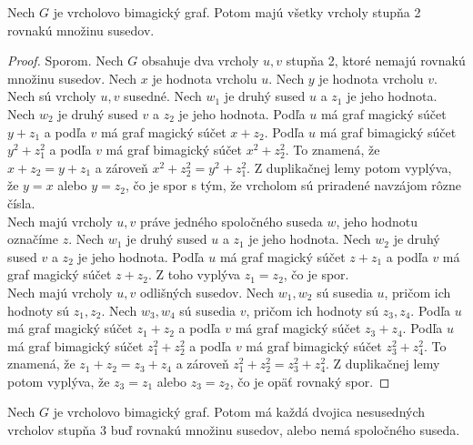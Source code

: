 \begin{subtheorem}
\label{vbgdegree2}
Nech $G$ je vrcholovo bimagický graf. Potom majú všetky vrcholy stupňa 2 rovnakú množinu susedov.
\end{subtheorem}

\begin{proof} Sporom. Nech $G$ obsahuje dva vrcholy $u,v$ stupňa 2, ktoré nemajú rovnakú množinu susedov. Nech $x$ je hodnota vrcholu $u$. Nech $y$ je hodnota vrcholu $v$. \\

Nech sú vrcholy $u,v$ susedné. Nech $w_1$ je druhý sused $u$ a $z_1$ je jeho hodnota. Nech $w_2$ je druhý sused $v$ a $z_2$ je jeho hodnota. Podľa $u$ má graf magický súčet $y + z_1$ a podľa $v$ má graf magický súčet $x + z_2$. Podľa $u$ má graf bimagický súčet $y^2 + z^2_1$ a podľa $v$ má graf bimagický súčet $x^2 + z^2_2$.  To znamená, že $x + z_2 = y + z_1$ a zároveň $x^2 + z^2_2 = y^2 + z^2_1$. Z duplikačnej lemy potom vyplýva, že $y = x$ alebo $y = z_2$, čo je spor s tým, že vrcholom sú priradené navzájom rôzne čísla. \\

Nech majú vrcholy $u,v$ práve jedného spoločného suseda $w$, jeho hodnotu označíme $z$. Nech $w_1$ je druhý sused $u$ a $z_1$ je jeho hodnota. Nech $w_2$ je druhý sused $v$ a $z_2$ je jeho hodnota. Podľa $u$ má graf magický súčet $z + z_1$ a podľa $v$ má graf magický súčet $z + z_2$. Z toho vyplýva $z_1 = z_2$, čo je spor. \\

Nech majú vrcholy $u,v$ odlišných susedov. Nech $w_1, w_2$ sú susedia $u$, pričom ich hodnoty sú $z_1, z_2$. Nech $w_3, w_4$ sú susedia $v$, pričom ich hodnoty sú $z_3, z_4$. Podľa $u$ má graf magický súčet $z_1 + z_2$ a podľa $v$ má graf magický súčet $z_3 + z_4$. Podľa $u$ má graf bimagický súčet $z^2_1 + z^2_2$ a podľa $v$ má graf bimagický súčet $z^2_3 + z^2_4$. To znamená, že $z_1 + z_2 = z_3 + z_4$ a zároveň $z^2_1 + z^2_2 = z^2_3 + z^2_4$. Z duplikačnej lemy potom vyplýva, že $z_3 = z_1$ alebo $z_3 = z_2$, čo je opäť rovnaký spor.
\end{proof}

\begin{subtheorem} 
\label{vbgdegree3}
Nech $G$ je vrcholovo bimagický graf. Potom má každá dvojica nesusedných vrcholov stupňa 3 buď rovnakú množinu susedov, alebo nemá spoločného suseda.
\end{subtheorem}

